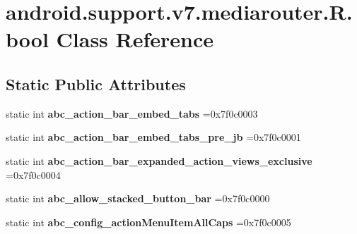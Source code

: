 \hypertarget{classandroid_1_1support_1_1v7_1_1mediarouter_1_1R_1_1bool}{}\section{android.\+support.\+v7.\+mediarouter.\+R.\+bool Class Reference}
\label{classandroid_1_1support_1_1v7_1_1mediarouter_1_1R_1_1bool}
\subsection*{Static Public Attributes}
\begin{DoxyCompactItemize}
\item 
\mbox{\label{classandroid_1_1support_1_1v7_1_1mediarouter_1_1R_1_1bool_a69a010e0dd49ae123b78838870c42927}} 
static int {\bfseries abc\+\_\+action\+\_\+bar\+\_\+embed\+\_\+tabs} =0x7f0c0003
\item 
\mbox{\label{classandroid_1_1support_1_1v7_1_1mediarouter_1_1R_1_1bool_acd452b31760a9b3c6c07875b16fbd041}} 
static int {\bfseries abc\+\_\+action\+\_\+bar\+\_\+embed\+\_\+tabs\+\_\+pre\+\_\+jb} =0x7f0c0001
\item 
\mbox{\label{classandroid_1_1support_1_1v7_1_1mediarouter_1_1R_1_1bool_a0d3e9722fe11bca356bfd75dc6e1ddb7}} 
static int {\bfseries abc\+\_\+action\+\_\+bar\+\_\+expanded\+\_\+action\+\_\+views\+\_\+exclusive} =0x7f0c0004
\item 
\mbox{\label{classandroid_1_1support_1_1v7_1_1mediarouter_1_1R_1_1bool_ad19e7bb9c2dcbfec21ed6373bc9af5c0}} 
static int {\bfseries abc\+\_\+allow\+\_\+stacked\+\_\+button\+\_\+bar} =0x7f0c0000
\item 
\mbox{\label{classandroid_1_1support_1_1v7_1_1mediarouter_1_1R_1_1bool_a2fe55fb05706972acaa2db8d8f07ca49}} 
static int {\bfseries abc\+\_\+config\+\_\+action\+Menu\+Item\+All\+Caps} =0x7f0c0005
\item 
\mbox{\label{classandroid_1_1support_1_1v7_1_1mediarouter_1_1R_1_1bool_a380be10cfee1d54629add0e1d9d90dfc}} 

\end{DoxyCompactItemize}
